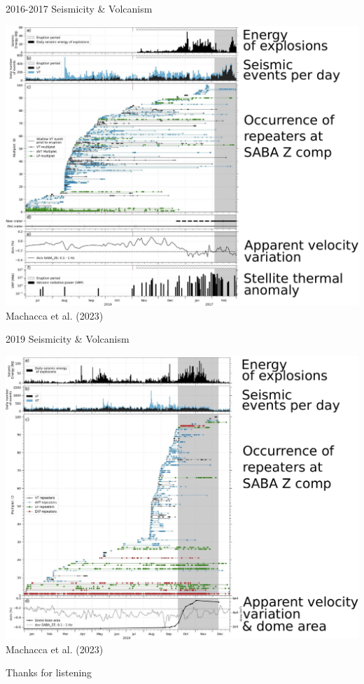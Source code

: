 \documentclass{beamer}
\begin{document}
\begin{frame}
 {2016-2017 Seismicity \& Volcanism}
 
 \centering
 \vskip -0.2cm \includegraphics[width=0.9\linewidth]{images/Roger-1.pdf} \\
 
 \hfill \small Machacca et al. (2023)
  
\end{frame}


\begin{frame}
 {2019 Seismicity \& Volcanism}

 \centering
 \vskip -0.2cm  \includegraphics[width=0.9\linewidth]{images/Roger-2.pdf}  \\
\hfill \small Machacca et al. (2023)
 
\end{frame}

\begin{frame}
 
 \centering
 \LARGE Thanks for listening \\
 
 
\end{frame}
\end{document}

